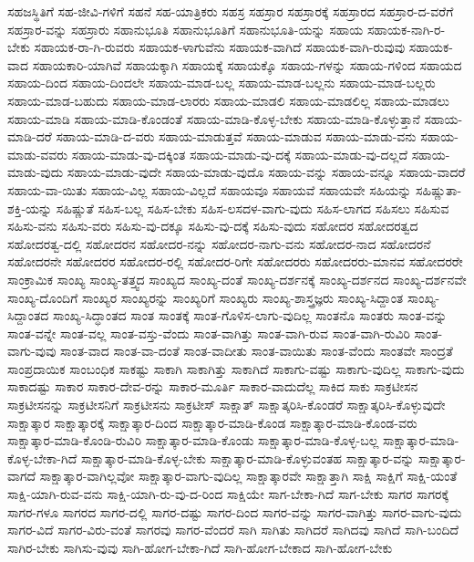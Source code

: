 {ಸಹಜಸ್ಥಿತಿಗೆ
ಸಹ-ಜೀವಿ-ಗಳಿಗೆ
ಸಹನೆ
ಸಹ-ಯಾತ್ರಿಕರು
ಸಹಸ್ರ
ಸಹಸ್ರಾರ
ಸಹಸ್ರಾರಕ್ಕೆ
ಸಹಸ್ರಾರದ
ಸಹಸ್ರಾರ-ದ-ವರೆಗೆ
ಸಹಸ್ರಾರ-ವನ್ನು
ಸಹಸ್ರಾರು
ಸಹಾನುಭೂತಿ
ಸಹಾನುಭೂತಿಗೆ
ಸಹಾನುಭೂತಿ-ಯನ್ನು
ಸಹಾಯ
ಸಹಾಯಕ-ನಾಗಿ-ರ-ಬೇಕು
ಸಹಾಯಕ-ರಾ-ಗಿ-ರುವರು
ಸಹಾಯಕ-ಳಾಗುವೆನು
ಸಹಾಯಕ-ವಾಗಿದೆ
ಸಹಾಯಕ-ವಾಗಿ-ರುವುವು
ಸಹಾಯಕ-ವಾದ
ಸಹಾಯಕಾರಿ-ಯಾಗಿವೆ
ಸಹಾಯಕ್ಕಾಗಿ
ಸಹಾಯಕ್ಕೆ
ಸಹಾಯಕ್ಕೊ
ಸಹಾಯ-ಗಳನ್ನು
ಸಹಾಯ-ಗಳಿಂದ
ಸಹಾಯದ
ಸಹಾಯ-ದಿಂದ
ಸಹಾಯ-ದಿಂದಲೇ
ಸಹಾಯ-ಮಾಡ-ಬಲ್ಲ
ಸಹಾಯ-ಮಾಡ-ಬಲ್ಲನು
ಸಹಾಯ-ಮಾಡ-ಬಲ್ಲರು
ಸಹಾಯ-ಮಾಡ-ಬಹುದು
ಸಹಾಯ-ಮಾಡ-ಲಾರರು
ಸಹಾಯ-ಮಾಡಲಿ
ಸಹಾಯ-ಮಾಡಲಿಲ್ಲ
ಸಹಾಯ-ಮಾಡಲು
ಸಹಾಯ-ಮಾಡಿ
ಸಹಾಯ-ಮಾಡಿ-ಕೊಂಡಂತೆ
ಸಹಾಯ-ಮಾಡಿ-ಕೊಳ್ಳ-ಬೇಕು
ಸಹಾಯ-ಮಾಡಿ-ಕೊಳ್ಳುತ್ತಾನೆ
ಸಹಾಯ-ಮಾಡಿ-ದರೆ
ಸಹಾಯ-ಮಾಡಿ-ದ-ವರು
ಸಹಾಯ-ಮಾಡುತ್ತವೆ
ಸಹಾಯ-ಮಾಡುವ
ಸಹಾಯ-ಮಾಡು-ವನು
ಸಹಾಯ-ಮಾಡು-ವವರು
ಸಹಾಯ-ಮಾಡು-ವು-ದಕ್ಕಿಂತ
ಸಹಾಯ-ಮಾಡು-ವು-ದಕ್ಕೆ
ಸಹಾಯ-ಮಾಡು-ವು-ದಲ್ಲದೆ
ಸಹಾಯ-ಮಾಡು-ವುದು
ಸಹಾಯ-ಮಾಡು-ವುದೇ
ಸಹಾಯ-ಮಾಡು-ವುದೊ
ಸಹಾಯ-ವನ್ನು
ಸಹಾಯ-ವನ್ನೂ
ಸಹಾಯ-ವಾದರೆ
ಸಹಾಯ-ವಾ-ಯಿತು
ಸಹಾಯ-ವಿಲ್ಲ
ಸಹಾಯ-ವಿಲ್ಲದೆ
ಸಹಾಯವೂ
ಸಹಾಯವೆ
ಸಹಾಯವೇ
ಸಹಿಯನ್ನು
ಸಹಿಷ್ಣುತಾ-ಶಕ್ತಿ-ಯನ್ನು
ಸಹಿಷ್ಣುತೆ
ಸಹಿಸ-ಬಲ್ಲ
ಸಹಿಸ-ಬೇಕು
ಸಹಿಸ-ಲಸದಳ-ವಾಗು-ವುದು
ಸಹಿಸ-ಲಾಗದ
ಸಹಿಸಲು
ಸಹಿಸುವ
ಸಹಿಸು-ವನು
ಸಹಿಸು-ವರು
ಸಹಿಸು-ವು-ದಕ್ಕೂ
ಸಹಿಸು-ವು-ದಕ್ಕೆ
ಸಹಿಸು-ವುದು
ಸಹೋದರ
ಸಹೋದರತ್ವದ
ಸಹೋದರತ್ವ-ದಲ್ಲಿ
ಸಹೋದರನ
ಸಹೋದರ-ನನ್ನು
ಸಹೋದರ-ನಾಗು-ವನು
ಸಹೋದರ-ನಾದ
ಸಹೋದರನೆ
ಸಹೋದರನೇ
ಸಹೋದರರ
ಸಹೋದರ-ರಲ್ಲಿ
ಸಹೋದರ-ರಿಗೇ
ಸಹೋದರರು
ಸಹೋದರರು-ಮಾನವ
ಸಹೋದರರೇ
ಸಾಂಕ್ರಾಮಿಕ
ಸಾಂಖ್ಯ
ಸಾಂಖ್ಯ-ತತ್ತ್ವದ
ಸಾಂಖ್ಯದ
ಸಾಂಖ್ಯ-ದಂತೆ
ಸಾಂಖ್ಯ-ದರ್ಶನಕ್ಕೆ
ಸಾಂಖ್ಯ-ದರ್ಶನದ
ಸಾಂಖ್ಯ-ದರ್ಶನವೇ
ಸಾಂಖ್ಯ-ದೊಂದಿಗೆ
ಸಾಂಖ್ಯರ
ಸಾಂಖ್ಯರನ್ನು
ಸಾಂಖ್ಯರಿಗೆ
ಸಾಂಖ್ಯರು
ಸಾಂಖ್ಯ-ಶಾಸ್ತ್ರಜ್ಞರು
ಸಾಂಖ್ಯ-ಸಿದ್ದಾಂತ
ಸಾಂಖ್ಯ-ಸಿದ್ದಾಂತದ
ಸಾಂಖ್ಯ-ಸಿದ್ಧಾಂತದ
ಸಾಂತ
ಸಾಂತಕ್ಕೆ
ಸಾಂತ-ಗೊಳಿಸ-ಲಾಗು-ವುದಿಲ್ಲ
ಸಾಂತನೊ
ಸಾಂತರು
ಸಾಂತ-ವನ್ನು
ಸಾಂತ-ವನ್ನೇ
ಸಾಂತ-ವಲ್ಲ
ಸಾಂತ-ವಸ್ತು-ವೆಂದು
ಸಾಂತ-ವಾಗಿತ್ತು
ಸಾಂತ-ವಾಗಿ-ರುವ
ಸಾಂತ-ವಾಗಿ-ರುವಿರಿ
ಸಾಂತ-ವಾಗು-ವುವು
ಸಾಂತ-ವಾದ
ಸಾಂತ-ವಾ-ದಂತೆ
ಸಾಂತ-ವಾದೀತು
ಸಾಂತ-ವಾಯಿತು
ಸಾಂತ-ವೆಂದು
ಸಾಂತವೇ
ಸಾಂದ್ರತೆ
ಸಾಂಪ್ರದಾಯಿಕ
ಸಾಂಬಂಧಿಕ
ಸಾಕಷ್ಟು
ಸಾಕಾಗಿ
ಸಾಕಾಗಿತ್ತು
ಸಾಕಾಗಿದೆ
ಸಾಕಾಗು-ವಷ್ಟು
ಸಾಕಾಗು-ವುದಿಲ್ಲ
ಸಾಕಾಗು-ವುದು
ಸಾಕಾದಷ್ಟು
ಸಾಕಾರ
ಸಾಕಾರ-ದೇವ-ರನ್ನು
ಸಾಕಾರ-ಮೂರ್ತಿ
ಸಾಕಾರ-ವಾದುದೆಲ್ಲ
ಸಾಕಿದ
ಸಾಕು
ಸಾಕ್ರಟೀಸನ
ಸಾಕ್ರಟೀಸನನ್ನು
ಸಾಕ್ರಟೀಸನಿಗೆ
ಸಾಕ್ರಟೀಸನು
ಸಾಕ್ರಟೀಸ್
ಸಾಕ್ಷಾತ್
ಸಾಕ್ಷಾತ್ಕರಿಸಿ-ಕೊಂಡರೆ
ಸಾಕ್ಷಾತ್ಕರಿಸಿ-ಕೊಳ್ಳುವುದೇ
ಸಾಕ್ಷಾತ್ಕಾರ
ಸಾಕ್ಷಾತ್ಕಾರಕ್ಕೆ
ಸಾಕ್ಷಾತ್ಕಾರ-ದಿಂದ
ಸಾಕ್ಷಾತ್ಕಾರ-ಮಾಡಿ-ಕೊಂಡ
ಸಾಕ್ಷಾತ್ಕಾರ-ಮಾಡಿ-ಕೊಂಡ-ವರು
ಸಾಕ್ಷಾತ್ಕಾರ-ಮಾಡಿ-ಕೊಂಡಿ-ರುವಿರಿ
ಸಾಕ್ಷಾತ್ಕಾರ-ಮಾಡಿ-ಕೊಂಡು
ಸಾಕ್ಷಾತ್ಕಾರ-ಮಾಡಿ-ಕೊಳ್ಳ-ಬಲ್ಲ
ಸಾಕ್ಷಾತ್ಕಾರ-ಮಾಡಿ-ಕೊಳ್ಳ-ಬೇಕಾ-ಗಿದೆ
ಸಾಕ್ಷಾತ್ಕಾರ-ಮಾಡಿ-ಕೊಳ್ಳ-ಬೇಕು
ಸಾಕ್ಷಾತ್ಕಾರ-ಮಾಡಿ-ಕೊಳ್ಳುವಂತಹ
ಸಾಕ್ಷಾತ್ಕಾರ-ವನ್ನು
ಸಾಕ್ಷಾತ್ಕಾರ-ವಾಗದೆ
ಸಾಕ್ಷಾತ್ಕಾರ-ವಾಗಿಲ್ಲವೋ
ಸಾಕ್ಷಾತ್ಕಾರ-ವಾಗು-ವುದಿಲ್ಲ
ಸಾಕ್ಷಾತ್ಕಾರವೇ
ಸಾಕ್ಷಾತ್ತಾಗಿ
ಸಾಕ್ಷಿ
ಸಾಕ್ಷಿಗೆ
ಸಾಕ್ಷಿ-ಯಂತೆ
ಸಾಕ್ಷಿ-ಯಾಗಿ-ರುವ-ವನು
ಸಾಕ್ಷಿ-ಯಾಗಿ-ರು-ವು-ದ-ರಿಂದ
ಸಾಕ್ಷಿಯೇ
ಸಾಗ-ಬೇಕಾ-ಗಿದೆ
ಸಾಗ-ಬೇಕು
ಸಾಗರ
ಸಾಗರಕ್ಕೆ
ಸಾಗರ-ಗಳೂ
ಸಾಗರದ
ಸಾಗರ-ದಲ್ಲಿ
ಸಾಗರ-ದಷ್ಟು
ಸಾಗರ-ದಿಂದ
ಸಾಗರ-ವನ್ನು
ಸಾಗರ-ವಾಗಿತ್ತು
ಸಾಗರ-ವಾಗು-ವುದು
ಸಾಗರ-ವಿದೆ
ಸಾಗರ-ವಿರು-ವಂತೆ
ಸಾಗರವು
ಸಾಗರ-ವೆಂದರೆ
ಸಾಗಿ
ಸಾಗಿತು
ಸಾಗಿದರೆ
ಸಾಗಿದವು
ಸಾಗಿದೆ
ಸಾಗಿ-ಬಂದಿದೆ
ಸಾಗಿರ-ಬೇಕು
ಸಾಗಿಸು-ವುವು
ಸಾಗಿ-ಹೋಗ-ಬೇಕಾ-ಗಿದೆ
ಸಾಗಿ-ಹೋಗ-ಬೇಕಾದ
ಸಾಗಿ-ಹೋಗ-ಬೇಕು
}
